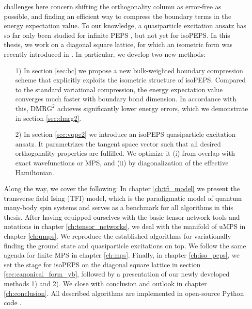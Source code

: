 challenges here concern shifting the orthogonality column as error-free as possible, and finding an efficient way to compress the boundary terms in the energy expectation value. To our knowledge, a quasiparticle excitation ansatz has so far only been studied for infinite PEPS \cite{vanderstraeten2015excitations, vanderstraeten2019simulating}, but not yet for isoPEPS. In this thesis, we work on a diagonal square lattice, for which an isometric form was recently introduced in \cite{sappler2025diagonal}. In particular, we develop two new methods:
\begin{enumerate}
	\item[1)] In section \ref{sec:bc} we propose a new bulk-weighted boundary compression scheme that explicitly exploits the isometric structure of isoPEPS. Compared to the standard variational compression, the energy expectation value converges much faster with boundary bond dimension. In accordance with this, $\text{DMRG}^2$ achieves significantly lower energy errors, which we demonstrate in section \ref{sec:dmrg2}.
	\item[2)] In section \ref{sec:vqpe2} we introduce an isoPEPS quasiparticle excitation ansatz. It parametrizes the tangent space vector such that all desired orthogonality properties are fulfilled. We optimize it (i) from overlap with exact wavefunctions or MPS, and (ii) by diagonalization of the effective Hamiltonian. 
\end{enumerate}
Along the way, we cover the following: In chapter \ref{ch:tfi_model} we present the transverse field Ising (TFI) model, which is the paradigmatic model of quantum many-body spin systems and serves as a benchmark for all algorithms in this thesis. After having equipped ourselves with the basic tensor network tools and notations in chapter \ref{ch:tensor_networks}, we deal with the manifold of uMPS in chapter \ref{ch:umps}. We reproduce the established algorithms for variationally finding the ground state and quasiparticle excitations on top. We follow the same agenda for finite MPS in chapter \ref{ch:mps}. Finally, in chapter \ref{ch:iso_peps}, we set the stage for isoPEPS on the diagonal square lattice in section \ref{sec:canonical_form_yb}, followed by a presentation of our newly developed methods 1) and 2). We close with conclusion and outlook in chapter \ref{ch:conclusion}. All described algorithms are implemented in open-source Python code \cite{wittmann2025iso}.